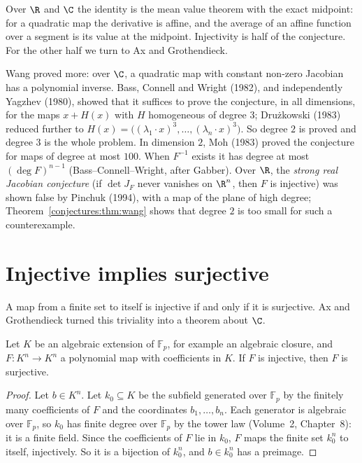 Over $\R$ and $\C$ the identity is the mean value theorem with the exact midpoint: for a quadratic map the derivative is affine, and the average of an affine
function over a segment is its value at the midpoint. Injectivity is half of the conjecture. For the other half we turn to Ax and Grothendieck.

\begin{remark}\label{conjectures:rem:jacknown}
Wang proved more: over $\C$, a quadratic map with constant non-zero Jacobian has a polynomial inverse. Bass, Connell and Wright (1982), and independently Yagzhev (1980), showed
that it suffices to prove the conjecture, in all dimensions, for the maps $x+H(x)$ with $H$ homogeneous of degree $3$; Dru\.zkowski (1983) reduced further to
$H(x)=\bigl((\lambda_1\cdot x)^3,\dots,(\lambda_n\cdot x)^3\bigr)$. So degree $2$ is proved and degree $3$ is the whole problem. In dimension $2$, Moh (1983)
proved the conjecture for maps of degree at most $100$. When $F^{-1}$ exists it has degree at most $(\deg F)^{n-1}$ (Bass--Connell--Wright, after Gabber).
Over $\R$, the \emph{strong real Jacobian conjecture} (if $\det J_F$ never vanishes on $\R^n$, then $F$ is injective) was shown false by Pinchuk
(1994), with a map of the plane of high degree; Theorem~\ref{conjectures:thm:wang} shows that degree $2$ is too small for such a counterexample.
\end{remark}

\section{Injective implies surjective}

A map from a finite set to itself is injective if and only if it is surjective. Ax and Grothendieck turned this triviality into a theorem about $\C$.

\begin{theorem}\label{conjectures:thm:axgr}
Let $K$ be an algebraic extension of $\mathbb F_p$, for example an algebraic closure, and $F:K^n\to K^n$ a polynomial map with coefficients in $K$. If $F$ is
injective, then $F$ is surjective.
\end{theorem}
\begin{proof}
Let $b\in K^n$. Let $k_0\subseteq K$ be the subfield generated over $\mathbb F_p$ by the finitely many coefficients of $F$ and the coordinates $b_1,\dots,b_n$.
Each generator is algebraic over $\mathbb F_p$, so $k_0$ has finite degree over $\mathbb F_p$ by the tower law (Volume~2, Chapter~8): it is a finite field.
Since the coefficients of $F$ lie in $k_0$, $F$ maps the finite set $k_0^n$ to itself, injectively. So it is a bijection of $k_0^n$, and $b\in k_0^n$ has a
preimage.
\end{proof}

